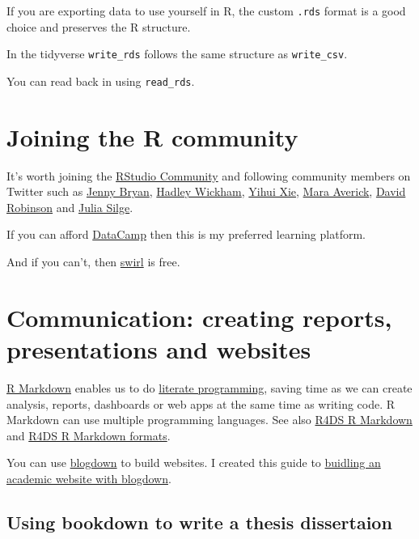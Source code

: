 \documentclass[12pt,]{book}
\theoremstyle{definition}
\theoremstyle{definition}
\theoremstyle{definition}
\theoremstyle{remark}
\begin{document}
If you are exporting data to use yourself in R, the custom \texttt{.rds}
format is a good choice and preserves the R structure.

In the tidyverse \texttt{write\_rds} follows the same structure as
\texttt{write\_csv}.

You can read back in using \texttt{read\_rds}.

\section{Joining the R community}\label{joining-the-r-community}

It's worth joining the \href{https://community.rstudio.com/}{RStudio
Community} and following community members on Twitter such as
\href{https://twitter.com/JennyBryan}{Jenny Bryan},
\href{https://twitter.com/hadleywickham}{Hadley Wickham},
\href{https://twitter.com/xieyihui}{Yihui Xie},
\href{https://twitter.com/dataandme}{Mara Averick},
\href{https://twitter.com/drob}{David Robinson} and
\href{https://twitter.com/juliasilge}{Julia Silge}.

If you can afford \href{https://www.datacamp.com}{DataCamp} then this is
my preferred learning platform.

And if you can't, then \href{https://swirlstats.com/}{swirl} is free.

\section{Communication: creating reports, presentations and
websites}\label{communication-creating-reports-presentations-and-websites}

\href{https://rmarkdown.rstudio.com/lesson-1.html}{R Markdown}
\citep{R-rmarkdown} enables us to do
\href{https://en.wikipedia.org/wiki/Literate_programming}{literate
programming}, saving time as we can create analysis, reports, dashboards
or web apps at the same time as writing code. R Markdown can use
multiple programming languages. See also
\href{http://r4ds.had.co.nz/r-markdown.html}{R4DS R Markdown} and
\href{http://r4ds.had.co.nz/r-markdown-formats.html}{R4DS R Markdown
formats}.

You can use \href{https://bookdown.org/yihui/blogdown/}{blogdown} to
build websites. I created this guide to
\href{http://ab604.github.io/docs/website_bookdown/}{buidling an
academic website with blogdown}.

\subsection{Using bookdown to write a thesis
dissertaion}\label{using-bookdown-to-write-a-thesis-dissertaion}
\end{document}
